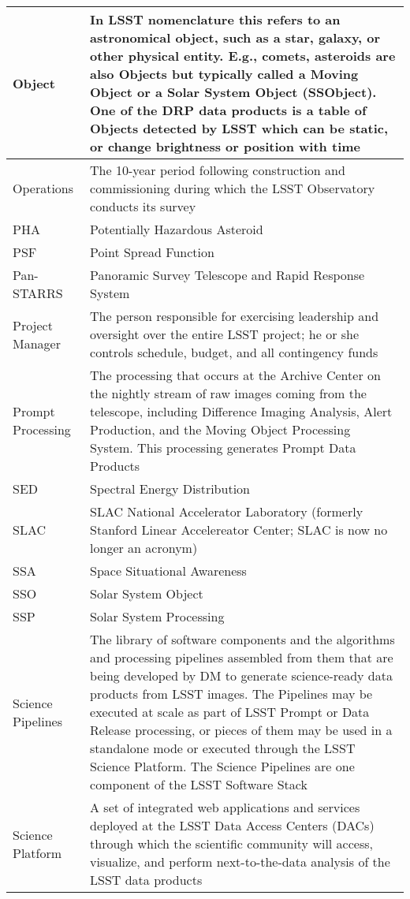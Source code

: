 \begin{longtable}{|p{}|p{}|}
Object & In \gls{LSST} nomenclature this refers to an \gls{astronomical object}, such as a star, galaxy, or other physical entity. E.g., comets, asteroids are also Objects but typically called a Moving Object or a \gls{Solar System Object} (SSObject). One of the \gls{DRP} data products is a table of Objects detected by \gls{LSST} which can be static, or change brightness or position with time \\\hline
Operations & The 10-year period following construction and commissioning during which the \gls{LSST} Observatory conducts its survey \\\hline
PHA & Potentially Hazardous Asteroid \\\hline
PSF & Point Spread Function \\\hline
Pan-STARRS & Panoramic Survey Telescope and Rapid Response System \\\hline
Project Manager & The person responsible for exercising leadership and oversight over the entire \gls{LSST} project; he or she controls schedule, budget, and all contingency funds \\\hline
Prompt Processing & The processing that occurs at the \gls{Archive Center} on the nightly stream of raw images coming from the telescope, including Difference Imaging Analysis, \gls{Alert Production}, and the \gls{Moving Object Processing System}. This processing generates Prompt Data Products \\\hline
SED & \gls{Spectral Energy Distribution} \\\hline
SLAC & \gls{SLAC} National Accelerator Laboratory (formerly Stanford Linear Accelereator \gls{Center}; \gls{SLAC} is now no longer an acronym) \\\hline
SSA & Space Situational Awareness \\\hline
SSO & \gls{Solar System Object} \\\hline
SSP & Solar System Processing \\\hline
Science Pipelines & The library of software components and the algorithms and processing pipelines assembled from them that are being developed by \gls{DM} to generate science-ready data products from \gls{LSST} images. The Pipelines may be executed at scale as part of \gls{LSST} Prompt or \gls{Data Release} processing, or pieces of them may be used in a standalone mode or executed through the \gls{LSST} \gls{Science Platform}. The \gls{Science Pipelines} are one component of the \gls{LSST} \gls{Software Stack} \\\hline
Science Platform & A set of integrated web applications and services deployed at the \gls{LSST} Data Access Centers (DACs) through which the scientific community will access, visualize, and perform next-to-the-data analysis of the \gls{LSST} data products \\\hline

\end{longtable}
